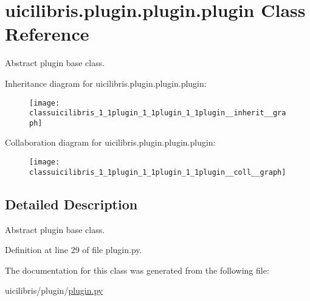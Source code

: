 \hypertarget{classuicilibris_1_1plugin_1_1plugin_1_1plugin}{\section{uicilibris.\-plugin.\-plugin.\-plugin \-Class \-Reference}
\label{classuicilibris_1_1plugin_1_1plugin_1_1plugin}
}


\-Abstract plugin base class.  




\-Inheritance diagram for uicilibris.\-plugin.\-plugin.\-plugin\-:
\nopagebreak
\begin{figure}[H]
\begin{center}
\leavevmode
\texttt{[image: classuicilibris\_1\_1plugin\_1\_1plugin\_1\_1plugin\_\_inherit\_\_graph]}
\end{center}
\end{figure}


\-Collaboration diagram for uicilibris.\-plugin.\-plugin.\-plugin\-:
\nopagebreak
\begin{figure}[H]
\begin{center}
\leavevmode
\texttt{[image: classuicilibris\_1\_1plugin\_1\_1plugin\_1\_1plugin\_\_coll\_\_graph]}
\end{center}
\end{figure}


\subsection{\-Detailed \-Description}
\-Abstract plugin base class. 



\-Definition at line 29 of file plugin.\-py.



\-The documentation for this class was generated from the following file\-:\begin{DoxyCompactItemize}
\item 
uicilibris/plugin/\hyperlink{plugin_8py}{plugin.\-py}\end{DoxyCompactItemize}
